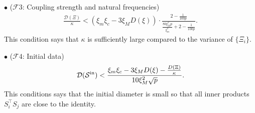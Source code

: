 \documentclass[11pt,reqno]{amsart}
\numberwithin{figure}{section}
\newcommand{\kp}{\kappa}
\newcommand{\init}{  {\textup{in}} }
\begin{document}
$\bullet$ ($\mathcal F3$: Coupling strength and natural frequencies)
\begin{equation} \label{F3}
	\begin{aligned}
		\frac{\mathcal D(\Xi)}{\kappa} <  (\xi_m\xi_c-3\xi_MD(\xi))\cdot \frac{2-\frac{1}{100p}}{\frac{80\xi_M^2p}{\xi_m^2}+2-\frac{1}{100p}}.
	\end{aligned}
\end{equation}
This condition says that $\kappa$ is sufficiently large compared to the variance of $\{\Xi_i\}$.


$\bullet$ ($\mathcal F4$: Initial data)
\begin{equation} \label{F4}
  \mathcal D(\mathcal S^\init)< \frac{\xi_m\xi_c-3\xi_MD(\xi)-\frac{D(\Xi)}{\kappa}}{10 \xi_M^2 \sqrt p}.
\end{equation}
 This conditions says that the initial diameter is small so that all inner products $S_i^\top S_j$ are close to the identity.\\
 

\end{document}
